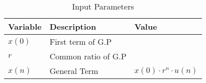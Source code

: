 \begin{table}[htbp]
\centering
\caption{Input Parameters}
\begin{tabular}{|p{1cm}|p{2.5cm}|p{2cm}|}
\hline
\textbf{Variable} & \textbf{Description} & \textbf{Value} \\
\hline
$x(0)$ &  First term of G.P & \\
\hline
$r$ & Common ratio of G.P & \\
\hline
$x(n)$ & General Term & $x(0) \cdot r^n \cdot u(n)$ \\
\hline

\end{tabular}

\end{table}